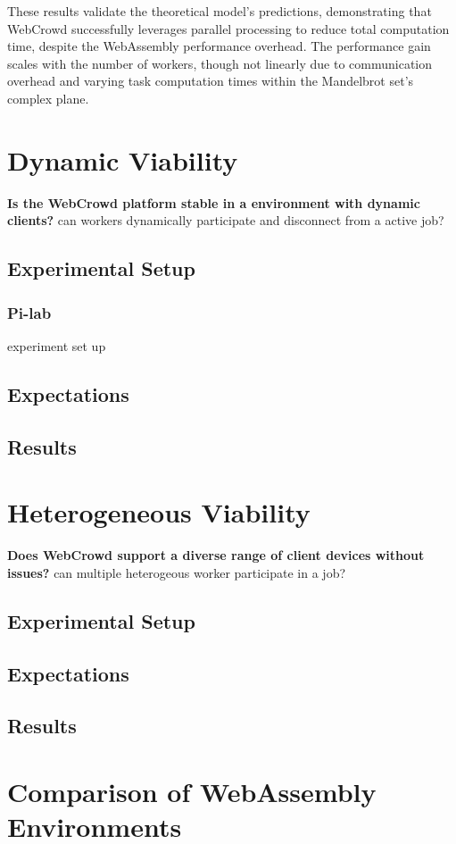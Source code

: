 These results validate the theoretical model's predictions, demonstrating that WebCrowd successfully leverages parallel processing to reduce total computation time, despite the WebAssembly performance overhead. The performance gain scales with the number of workers, though not linearly due to communication overhead and varying task computation times within the Mandelbrot set's complex plane.

\section{Dynamic Viability}
\label{sec:evaluation:dynamic}
\textbf{Is the WebCrowd platform stable in a environment with dynamic clients?}
\newline
can workers dynamically participate and disconnect from a active job?

\subsection{Experimental Setup}

\subsubsection{Pi-lab}
experiment set up

\subsection{Expectations}

\subsection{Results}

\section{Heterogeneous Viability}
\label{sec:evaluation:heterogen}
\textbf{Does WebCrowd support a diverse range of client devices without issues?}
\newline
can multiple heterogeous worker participate in a job?

\subsection{Experimental Setup}

\subsection{Expectations}

\subsection{Results}

\section{Comparison of WebAssembly Environments}
\label{sec:evaluation:languages}